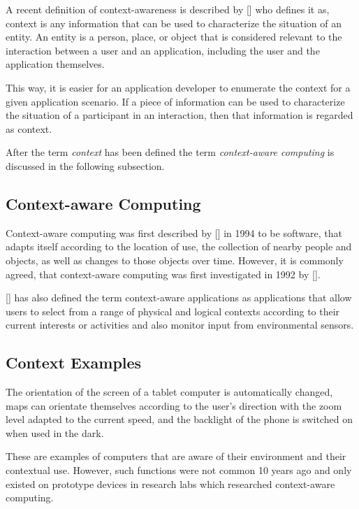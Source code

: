 A recent definition of context-awareness is described by [\citeauthor{Dey2000b}] who defines it as, context is any information that can be used to characterize the situation of an entity. An entity is a person, place, or object that is considered relevant to the interaction between a user and an application, including the user and the application themselves. 

This way, it is easier for an application developer to enumerate the context for a given application scenario. If a piece of information can be used to characterize the situation of a participant in an interaction, then that information is regarded as context.

After the term \textit{context} has been defined the term \textit{context-aware computing} is discussed in the following subsection.

\subsection{Context-aware Computing}
Context-aware computing was first described by [\citeauthor{ieee313011}] in 1994 to be software, that adapts itself according to the location of use, the collection of nearby people and objects, as well as changes to those objects over time. However, it is commonly agreed, that context-aware computing was first investigated in 1992 by [\citeauthor{WantHFG92}]. 

[\citeauthor{RyanME}] has also defined the term context-aware applications as applications that allow users to select from a range of physical and logical contexts according to their current interests or activities and also monitor input from environmental sensors.


\subsection{Context Examples}
The orientation of the screen of a tablet computer is automatically changed, maps can orientate themselves according to the user's direction with the zoom level adapted to the current speed, and the backlight of the phone is switched on when used in the dark.

These are examples of computers that are aware of their environment and their contextual use. However, such functions were not common 10 years ago and only existed on prototype devices in research labs which researched context-aware computing.
\\


